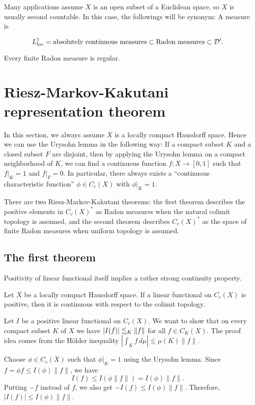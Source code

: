 \documentclass{../crs}
\begin{document}
Many applications assume $X$ is an open subset of a Euclidean space, so $X$ is usually second countable.
In this case, the followings will be synonym: A measure is
\begin{cond}
\item 
\end{cond}



\[L_{\text{loc}}^1=\text{absolutely continuous measures}\subset\text{Radon measures}\subset\mathcal{D}'.\]


\begin{thm}
Every finite Radon measure is regular.
\end{thm}

\section{Riesz-Markov-Kakutani representation theorem}
In this section, we always assume $X$ is a locally compact Hausdorff space.
Hence we can use the Urysohn lemma in the following way: If a compact subset $K$ and a closed subset $F$ are disjoint, then by applying the Urysohn lemma on a compact neighborhood of $K$, we can find a continuous function $f:X\to[0,1]$ such that $f|_K=1$ and $f|_F=0$.
In particular, there always exists a ``continuous characteristic function'' $\phi\in C_c(X)$ with $\phi|_K=1$.

There are two Riesz-Markov-Kakutani theorems: the first theorem describes the positive elements in $C_c(X)^*$ as Radon measures when the natural colimit topology is assumed, and the second theorem describes $C_c(X)^*$ as the space of finite Radon measures when uniform topology is assumed.

\subsection{The first theorem}
Positivity of linear functional itself implies a rather strong continuity property.
\begin{thm}
Let $X$ be a locally compact Hausdorff space.
If a linear functional on $C_c(X)$ is positive, then it is continuous with respect to the colimit topology.
\end{thm}
\begin{pf}
Let $I$ be a positive linear functional on $C_c(X)$.
We want to show that on every compact subset $K$ of $X$ we have $|I(f)|\lesssim_K\|f\|$ for all $f\in C_K(X)$.
The proof idea comes from the H\"older inequality $|\int_K f\,d\mu|\le\mu(K)\|f\|$.

Choose $\phi\in C_c(X)$ such that $\phi|_K=1$ using the Urysohn lemma.
Since $f=\phi f\le I(\phi)\|f\|$, we have
\[I(f)\le I(\phi\|f\|)=I(\phi)\|f\|.\]
Putting $-f$ instead of $f$, we also get $-I(f)\le I(\phi)\|f\|$.
Therefore, $|I(f)|\le I(\phi)\|f\|$.
\end{pf}
\end{document}
